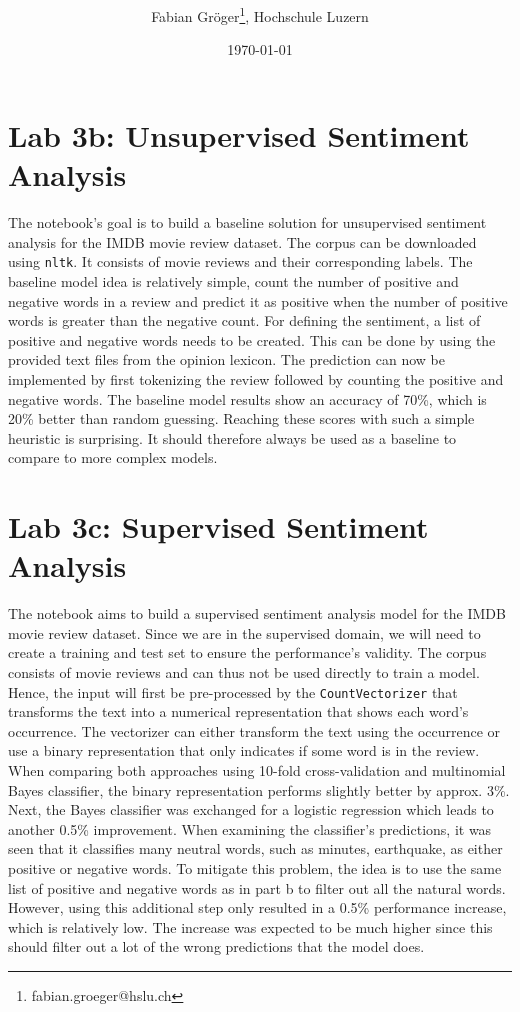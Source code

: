 \documentclass[onecolumn]{article}
\title{\vspace{-3cm}\spacecaps{Lab report: SW05 }\\ \normalsize \spacesc{TSM\_AnTeDe} }
\author{Fabian Gröger\thanks{fabian.groeger@hslu.ch}, Hochschule Luzern}
\date{\today}
\begin{document}
\maketitle

\section{Lab 3b: Unsupervised Sentiment Analysis}
The notebook's goal is to build a baseline solution for unsupervised sentiment analysis for the IMDB movie review dataset. The corpus can be downloaded using \texttt{nltk}. It consists of movie reviews and their corresponding labels. The baseline model idea is relatively simple, count the number of positive and negative words in a review and predict it as positive when the number of positive words is greater than the negative count. For defining the sentiment, a list of positive and negative words needs to be created. This can be done by using the provided text files from the opinion lexicon. The prediction can now be implemented by first tokenizing the review followed by counting the positive and negative words. The baseline model results show an accuracy of 70\%, which is 20\% better than random guessing. Reaching these scores with such a simple heuristic is surprising. It should therefore always be used as a baseline to compare to more complex models.

\section{Lab 3c: Supervised Sentiment Analysis}
The notebook aims to build a supervised sentiment analysis model for the IMDB movie review dataset. Since we are in the supervised domain, we will need to create a training and test set to ensure the performance's validity. The corpus consists of movie reviews and can thus not be used directly to train a model. Hence, the input will first be pre-processed by the \texttt{CountVectorizer} that transforms the text into a numerical representation that shows each word's occurrence. The vectorizer can either transform the text using the occurrence or use a binary representation that only indicates if some word is in the review. When comparing both approaches using 10-fold cross-validation and multinomial Bayes classifier, the binary representation performs slightly better by approx. 3\%. Next, the Bayes classifier was exchanged for a logistic regression which leads to another 0.5\% improvement. When examining the classifier's predictions, it was seen that it classifies many neutral words, such as minutes, earthquake, as either positive or negative words. To mitigate this problem, the idea is to use the same list of positive and negative words as in part b to filter out all the natural words. However, using this additional step only resulted in a 0.5\% performance increase, which is relatively low. The increase was expected to be much higher since this should filter out a lot of the wrong predictions that the model does. 
\end{document}
